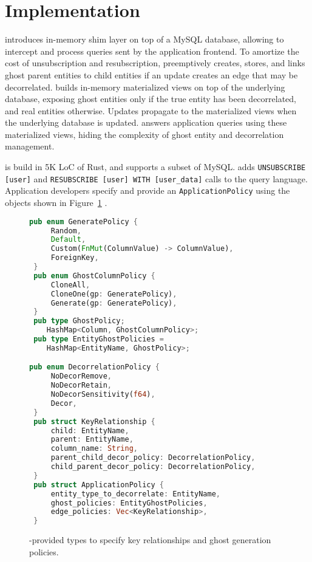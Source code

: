 \section{Implementation}

\sys{} introduces in-memory shim layer on top of a MySQL database, 
allowing \sys{} to intercept and process queries sent by the application frontend. 
To amortize the cost of unsubscription and resubscription, \sys{} preemptively creates, stores, and
links ghost parent entities to child entities if an update creates an edge that may be decorrelated.
\sys{} builds in-memory materialized views on top of the underlying database, exposing ghost
entities only if the true entity has been decorrelated, and real entities otherwise. Updates
propagate to the materialized views when the underlying database is updated. \sys{} answers
application queries using these materialized views, hiding the complexity of ghost entity and
decorrelation management.

\sys{} is build in 5K LoC of Rust, and supports a subset of MySQL. \sys{} adds \texttt{UNSUBSCRIBE
[user]} and \texttt{RESUBSCRIBE [user] WITH [user\_data]} calls to the query language.
Application developers specify and provide an \texttt{ApplicationPolicy} using the objects shown in
Figure~\ref{fig:policytype} .

\begin{figure}
\begin{lstlisting}[language=Rust]
 pub enum GeneratePolicy {
     Random,
     Default,
     Custom(FnMut(ColumnValue) -> ColumnValue),
     ForeignKey, 
 }
 pub enum GhostColumnPolicy {
     CloneAll,
     CloneOne(gp: GeneratePolicy),
     Generate(gp: GeneratePolicy),
 }
 pub type GhostPolicy;
    HashMap<Column, GhostColumnPolicy>;
 pub type EntityGhostPolicies = 
    HashMap<EntityName, GhostPolicy>;

pub enum DecorrelationPolicy {
     NoDecorRemove,
     NoDecorRetain,
     NoDecorSensitivity(f64),
     Decor,
 }
 pub struct KeyRelationship {
     child: EntityName,
     parent: EntityName,
     column_name: String,
     parent_child_decor_policy: DecorrelationPolicy,
     child_parent_decor_policy: DecorrelationPolicy,
 }
 pub struct ApplicationPolicy {
     entity_type_to_decorrelate: EntityName,
     ghost_policies: EntityGhostPolicies,
     edge_policies: Vec<KeyRelationship>,
 }
\end{lstlisting}
    \label{fig:policytype}
    \caption{\sys{}-provided types to specify key relationships and ghost generation policies.}
\end{figure}

